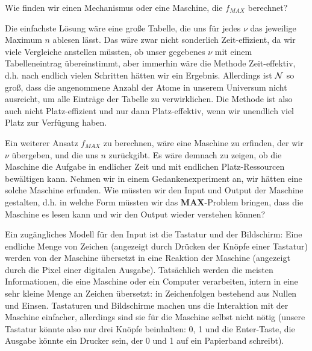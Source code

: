 \noindent
Wie finden wir einen Mechanismus oder eine Maschine, die $f_{MAX}$ berechnet?

Die einfachste Lösung wäre eine große Tabelle, die uns für jedes $\nu$
das jeweilige Maximum $n$ ablesen lässt.
Das wäre zwar nicht sonderlich Zeit-effizient,
da wir viele Vergleiche anstellen müssten,
ob unser gegebenes $\nu$ mit einem Tabelleneintrag übereinstimmt,
aber immerhin wäre die Methode Zeit-effektiv, 
d.h. nach endlich vielen Schritten hätten wir ein Ergebnis.
Allerdings ist $\cal{N}$ so groß,
dass die angenommene Anzahl der Atome in unserem Universum nicht ausreicht,
um alle Einträge der Tabelle zu verwirklichen.
Die Methode ist also auch nicht Platz-effizient und nur dann Platz-effektiv,
wenn wir unendlich viel Platz zur Verfügung haben.

Ein weiterer Ansatz $f_{MAX}$ zu berechnen,
wäre eine Maschine zu erfinden, der wir $\nu$ übergeben,
und die uns $n$ zurückgibt.
Es wäre demnach zu zeigen, ob die Maschine die Aufgabe in endlicher Zeit
und mit endlichen Platz-Ressourcen bewältigen kann.
Nehmen wir in einem Gedankenexperiment an, wir hätten eine solche Maschine erfunden.
Wie müssten wir den Input und Output der Maschine gestalten,
d.h. in welche Form müssten wir das \textbf{MAX}-Problem bringen,
dass die Maschine es lesen kann und wir den Output wieder verstehen können? 

Ein zugängliches Modell für den Input ist die Tastatur und der Bildschirm:
Eine endliche Menge von Zeichen (angezeigt durch Drücken der Knöpfe einer Tastatur)
werden von der Maschine übersetzt in eine Reaktion der Maschine 
(angezeigt durch die Pixel einer digitalen Ausgabe).
Tatsächlich werden die meisten Informationen,
die eine Maschine oder ein Computer verarbeiten,
intern in eine sehr kleine Menge an Zeichen übersetzt:
in Zeichenfolgen bestehend aus Nullen und Einsen.
Tastaturen und Bildschirme machen uns die Interaktion mit der Maschine einfacher,
allerdings sind sie für die Maschine selbst nicht nötig
(unsere Tastatur könnte also nur drei Knöpfe beinhalten: 0, 1 und die Enter-Taste,
die Ausgabe könnte ein Drucker sein, der 0 und 1 auf ein Papierband schreibt).


